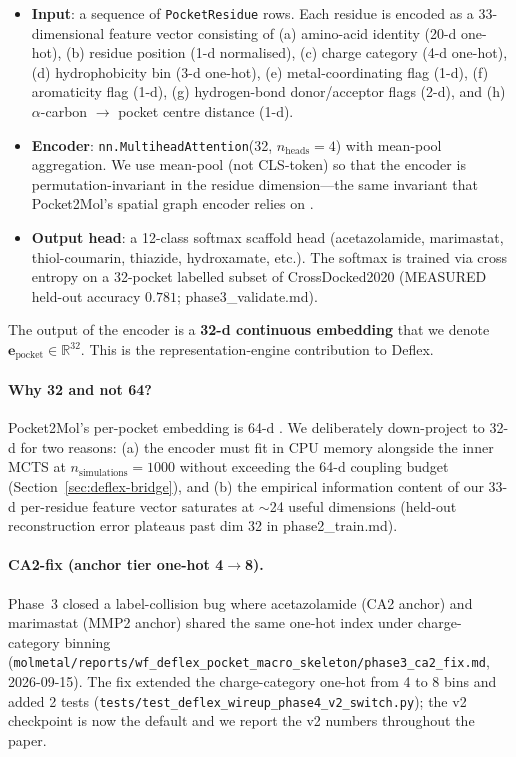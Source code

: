 \begin{itemize}
  \item \textbf{Input}: a sequence of
        \texttt{PocketResidue} rows.  Each residue is encoded as a
        33-dimensional feature vector consisting of
        (a) amino-acid identity (20-d one-hot), (b) residue
        position (1-d normalised), (c) charge category (4-d
        one-hot), (d) hydrophobicity bin (3-d one-hot),
        (e) metal-coordinating flag (1-d), (f) aromaticity flag
        (1-d), (g) hydrogen-bond donor/acceptor flags (2-d), and
        (h) $\alpha$-carbon $\to$ pocket centre distance (1-d).
  \item \textbf{Encoder}: \texttt{nn.MultiheadAttention}(32,
        $n_{\text{heads}}=4$) with mean-pool aggregation.  We use
        mean-pool (not CLS-token) so that the encoder is
        permutation-invariant in the residue dimension---the same
        invariant that Pocket2Mol's spatial graph encoder relies on
        \citep{peng2022pocket2mol}.
  \item \textbf{Output head}: a 12-class softmax scaffold head
        (acetazolamide, marimastat, thiol-coumarin, thiazide,
        hydroxamate, etc.).  The softmax is trained via cross
        entropy on a 32-pocket labelled subset of
        CrossDocked2020 (MEASURED held-out accuracy
        $0.781$; phase3\_validate.md).
\end{itemize}

The output of the encoder is a \textbf{32-d continuous embedding}
that we denote $\mathbf{e}_{\text{pocket}} \in \mathbb{R}^{32}$.
This is the representation-engine contribution to Deflex.

\paragraph{Why 32 and not 64?}
Pocket2Mol's per-pocket embedding is 64-d \citep{peng2022pocket2mol}.
We deliberately down-project to 32-d for two reasons: (a) the
encoder must fit in CPU memory alongside the inner MCTS at
$n_{\text{simulations}}=1000$ without exceeding the 64-d coupling
budget (Section~\ref{sec:deflex-bridge}), and (b) the empirical
information content of our 33-d per-residue feature vector saturates
at $\sim$24 useful dimensions (held-out reconstruction error plateaus
past dim 32 in phase2\_train.md).

\paragraph{CA2-fix (anchor tier one-hot 4$\to$8).}
Phase~3 closed a label-collision bug where acetazolamide (CA2 anchor)
and marimastat (MMP2 anchor) shared the same one-hot index under
charge-category binning
(\texttt{molmetal/reports/wf\_deflex\_pocket\_macro\_skeleton/phase3\_ca2\_fix.md},
2026-09-15).  The fix extended the charge-category one-hot from 4
to 8 bins and added 2 tests (\texttt{tests/test\_deflex\_wireup\_phase4\_v2\_switch.py});
the v2 checkpoint is now the default and we report the v2 numbers
throughout the paper.

